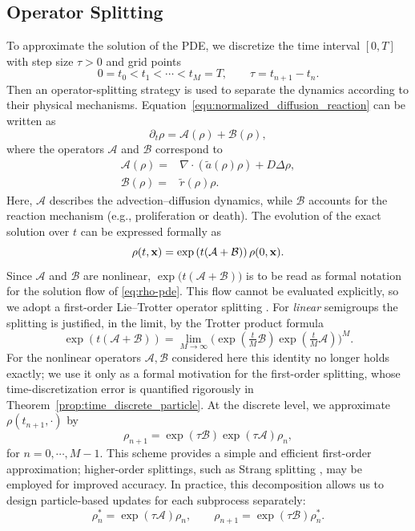 \documentclass[a4paper,fleqn]{cas-sc}
\theoremstyle{definition}
\theoremstyle{remark}
\begin{document}
\subsection{Operator Splitting}
To approximate the solution of the PDE, we discretize the time interval $[0,T]$ with step size $\tau>0$ and grid points
\[
0 = t_0 < t_1 < \cdots < t_M = T,\qquad \tau=t_{n+1}-t_n.
\]
Then an operator-splitting strategy is used to separate the dynamics according to their physical mechanisms. 
Equation~\eqref{equ:normalized_diffusion_reaction} can be written as
\begin{equation}\label{eq:rho-pde}
\partial_t \rho = \mathcal{A}(\rho) + \mathcal{B}(\rho) ,
\end{equation}
where the operators $\mathcal{A}$ and $\mathcal{B}$ correspond to
\begin{align}
\mathcal{A}(\rho) =& \nabla \cdot \left( \tilde a(\rho)\rho \right) + D\Delta\rho  ,\label{eq:operator-A} \\
\mathcal{B}(\rho) =& \tilde r(\rho)\rho \label{eq:operator-B}.
\end{align}
Here, $\mathcal{A}$ describes the advection--diffusion dynamics, while $\mathcal{B}$ accounts for the reaction mechanism (e.g., proliferation or death).  The evolution of the exact solution over $t$ can be expressed formally as
\begin{equation}\label{}
\rho(t,\mathbf{x}) = \exp\left( t (\mathcal{A} + \mathcal{B}) \right)\rho(0,\mathbf{x}).
\end{equation}
Since $\mathcal A$ and $\mathcal B$ are nonlinear, $\exp\!\big(t(\mathcal{A}+\mathcal{B})\big)$ is to be read as formal notation for the solution flow of \eqref{eq:rho-pde}. This flow cannot be evaluated explicitly, so we adopt a first-order Lie--Trotter operator splitting \cite{trotter1959product}. For \emph{linear} semigroups the splitting is justified, in the limit, by the Trotter product formula
\begin{equation}
\exp\!\left( t (\mathcal{A} + \mathcal{B}) \right) 
= \lim_{M\to\infty} \Big( \exp\!\left(\tfrac{t}{M} \mathcal{B}\right) 
                          \exp\!\left(\tfrac{t}{M} \mathcal{A}\right) \Big)^M .
\end{equation}
For the nonlinear operators $\mathcal A,\mathcal B$ considered here this identity no longer holds exactly; we use it only as a formal motivation for the first-order splitting, whose time-discretization error is quantified rigorously in Theorem~\ref{prop:time_discrete_particle}.
At the discrete level, we approximate $\rho(t_{n+1},\cdot)$ by
\begin{equation}
\rho_{n+1} = \exp(\tau \mathcal{B}) \exp(\tau \mathcal{A}) \rho_n ,
\end{equation}
for $n=0,\cdots,M-1$.
This scheme provides a simple and efficient first-order approximation; 
higher-order splittings, such as Strang splitting \cite{strang1968construction}, may be employed for improved accuracy.
In practice, this decomposition allows us to design particle-based updates for each subprocess separately:
\begin{equation}\label{eq:lie-trotter}
\rho_n^\ast = \exp(\tau \mathcal{A})\rho_n, 
\qquad 
\rho_{n+1} = \exp(\tau \mathcal{B})\rho_n^\ast.
\end{equation}
\end{document}
